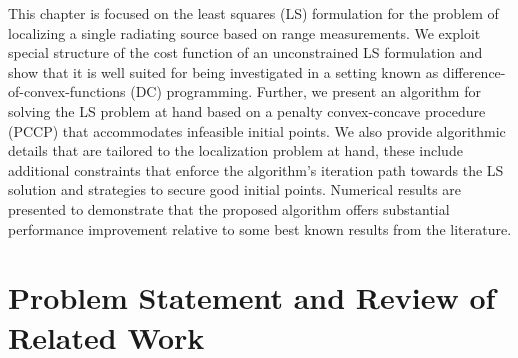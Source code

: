 \label{chapter:pccp}


%
%
%
%
%
%
%


This chapter is focused on the least squares (LS) formulation for the problem of localizing a single radiating source based on range measurements.   We exploit special structure of the cost function of an unconstrained LS formulation and show that it is well suited for being investigated in a setting known as difference-of-convex-functions (DC) programming. Further, we present an algorithm for solving the LS problem at hand based on a penalty convex-concave procedure (PCCP) \cite{LBoyd} that accommodates infeasible initial points. We also provide algorithmic details that are tailored to the localization problem at hand, these include additional constraints that enforce the algorithm’s  iteration path towards the LS solution and strategies to secure good initial points. %
Numerical results are presented to demonstrate that the proposed algorithm offers substantial performance improvement relative to some best known results from the literature.


\section{Problem Statement and Review of Related Work}%


